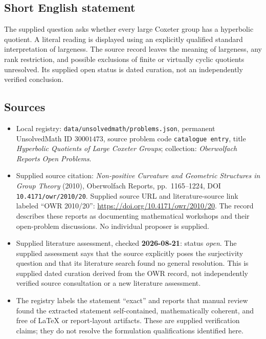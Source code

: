 \documentclass[11pt]{article}
\begin{document}
\subsection{Short English statement}
The supplied question asks whether every large Coxeter group has a hyperbolic quotient. A literal reading is displayed using an explicitly qualified standard interpretation of largeness. The source record leaves the meaning of largeness, any rank restriction, and possible exclusions of finite or virtually cyclic quotients unresolved. Its supplied open status is dated curation, not an independently verified conclusion.
\subsection{Sources}
\begin{itemize}
\item Local registry: \texttt{data/unsolvedmath/problems.json}, permanent UnsolvedMath ID \(30001473\), source problem code \texttt{catalogue entry}, title \emph{Hyperbolic Quotients of Large Coxeter Groups}; collection: \emph{Oberwolfach Reports Open Problems}.
\item Supplied source citation: \emph{Non-positive Curvature and Geometric Structures in Group Theory} (2010), Oberwolfach Reports, pp.~1165--1224, DOI \texttt{10.4171/owr/2010/20}. Supplied source URL and literature-source link labeled ``OWR 2010/20'': \url{https://doi.org/10.4171/owr/2010/20}. The record describes these reports as documenting mathematical workshops and their open-problem discussions. No individual proposer is supplied.
\item Supplied literature assessment, checked \textbf{2026-08-21}: status \emph{open}. The supplied assessment says that the source explicitly poses the surjectivity question and that its literature search found no general resolution. This is supplied dated curation derived from the OWR record, not independently verified source consultation or a new literature assessment.
\item The registry labels the statement ``exact'' and reports that manual review found the extracted statement self-contained, mathematically coherent, and free of LaTeX or report-layout artifacts. These are supplied verification claims; they do not resolve the formulation qualifications identified here.
\end{itemize}
\end{document}
